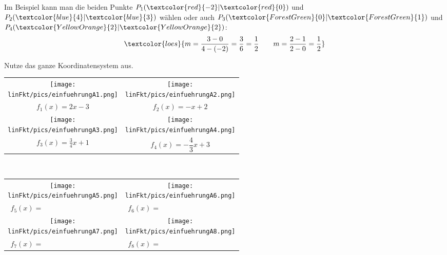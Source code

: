 Im Beispiel kann man die beiden Punkte $P_1(\textcolor{red}{-2}|\textcolor{red}{0})$ und $P_2(\textcolor{blue}{4}|\textcolor{blue}{3})$ wählen oder auch $P_3(\textcolor{ForestGreen}{0}|\textcolor{ForestGreen}{1})$ und $P_4(\textcolor{YellowOrange}{2}|\textcolor{YellowOrange}{2})$:
\begin{align*}
	\textcolor{loes}{m=\dfrac{3-0}{4-(-2)}=\dfrac{3}{6}=\dfrac{1}{2}
	\qquad
	m=\dfrac{2-1}{2-0}=\dfrac{1}{2}}
\end{align*}
\newpage
\begin{Exercise}[title={Zeichne das Schaubild der folgenden Funktionen}, label=lineareFktEinfuehrungA1]
	
	Nutze das ganze Koordinatensystem aus.
	
	\begin{minipage}[t]{\textwidth}
		\begin{tabular}{cc}
			\centering
			\texttt{[image: \\linFkt/pics/einfuehrungA1.png]}&\texttt{[image: \\linFkt/pics/einfuehrungA2.png]}  \\
			$f_1(x)=2x-3$&	$f_2(x)=-x+2$  \\ \addlinespace[20pt]
			\texttt{[image: \\linFkt/pics/einfuehrungA3.png]}&\texttt{[image: \\linFkt/pics/einfuehrungA4.png]}  \\
			$f_3(x)=\frac{3}{4}x+1$&	$f_4(x)=-\dfrac{4}{3}x+3$  \\
		\end{tabular}
\end{minipage}
\end{Exercise}
\newpage
\begin{Exercise}[title={Bestimme die Funktionsgleichung}, label=lineareFktEinfuehrungA2]\\
	\begin{minipage}[t]{\textwidth}
		\begin{tabular}{cc}
			\centering
			\texttt{[image: \\linFkt/pics/einfuehrungA5.png]}&\texttt{[image: \\linFkt/pics/einfuehrungA6.png]}  \\
			$f_5(x)=\qquad\qquad\qquad\qquad\qquad$&	$f_6(x)=\qquad\qquad\qquad\qquad\qquad$  \\ \addlinespace[20pt]
			\texttt{[image: \\linFkt/pics/einfuehrungA7.png]}&\texttt{[image: \\linFkt/pics/einfuehrungA8.png]}  \\
			$f_7(x)=\qquad\qquad\qquad\qquad\qquad$&	$f_8(x)=\qquad\qquad\qquad\qquad\qquad$  \\
		\end{tabular}
\end{minipage}
\end{Exercise}
